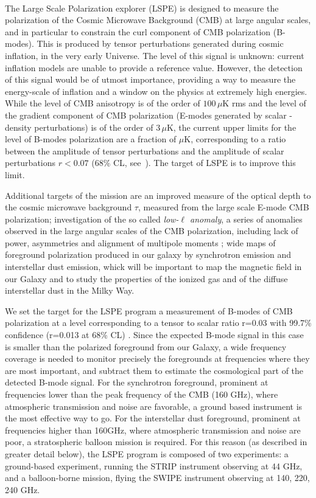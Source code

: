 \\
The Large Scale Polarization explorer (LSPE) is designed to measure the polarization of the 
Cosmic Microwave Background (CMB) at large
angular scales, and in particular to constrain the curl component of CMB polarization (B-modes).
This is produced by tensor perturbations generated during cosmic inflation, in the very early Universe.
The level of this signal is unknown: current inflation models are unable to provide a reference
value. However, the detection of this signal would be of utmost importance, providing a way to
measure the energy-scale of inflation and a window on the physics at extremely high energies.
While the level of CMB anisotropy is of the order of $100\,\mu$K rms and the level of the gradient
component of CMB polarization (E-modes generated by scalar - density perturbations) is of the order
of $3\,\mu$K, the current upper limits for the level of B-modes polarization are a fraction of $\mu$K,
corresponding to a ratio between the amplitude of tensor perturbations and the amplitude of scalar
perturbations $r < 0.07$ (68\% CL, see~\citet{bicep2018}). 
The target of LSPE is to improve this limit.

Additional targets of the mission are 
an improved measure of the optical depth to the 
cosmic microwave background $\tau$, measured from the large scale
E-mode CMB polarization; investigation of the so called
{\em low-$\ell$ anomaly}, a series of anomalies observed in the
large angular scales of the CMB polarization, including
lack of power, asymmetries and alignment of multipole moments \citep{planckIandS2016}
; 
wide maps of foreground polarization produced in our galaxy
by synchrotron emission and interstellar dust emission, whick will be important to map the magnetic
field in our Galaxy and to study the properties of the ionized gas and of the diffuse interstellar dust
in the Milky Way.

We set the target for the LSPE program a measurement of B-modes of CMB polarization
at a level corresponding to a tensor to scalar ratio r=0.03 with 99.7\% confidence (r=0.013 at 68\% CL)
.
Since the expected B-mode signal in this case is smaller than the polarized foreground from our
Galaxy, a wide frequency coverage is needed to monitor precisely the foregrounds at frequencies
where they are most important, and subtract them to estimate the cosmological part of the detected
B-mode signal. For the synchrotron foreground, prominent at frequencies lower than the peak
frequency of the CMB (160 GHz), where atmospheric transmission and noise are favorable, a ground
based instrument is the most effective way to go. For the interstellar dust foreground, prominent at
frequencies higher than 160GHz, where atmospheric transmission and noise are poor, a stratospheric
balloon mission is required. For this reason (as described in greater detail below), the LSPE program
is composed of two experiments: a ground-based experiment, running the STRIP instrument
observing at 44 GHz, and a balloon-borne mission, flying the SWIPE instrument observing at 140,
220, 240 GHz.

